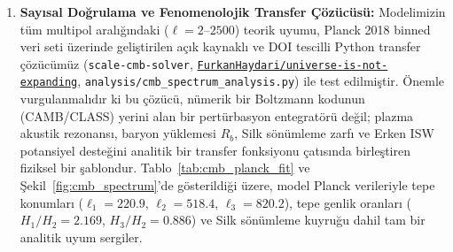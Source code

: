 \begin{enumerate}
          \begin{equation}
              \mathcal{D}(\ell) = \exp\left[ - 2 \left( \frac{\ell}{\ell_D} \right)^{m} \right], \quad \ell_D \approx 1450\text{--}1650, \; m \approx 1.25.
          \end{equation}
    \item \textbf{Sayısal Doğrulama ve Fenomenolojik Transfer Çözücüsü:}
          Modelimizin tüm multipol aralığındaki ($\ell = 2\text{--}2500$) teorik uyumu, Planck 2018 binned veri seti üzerinde geliştirilen açık kaynaklı ve DOI tescilli Python transfer çözücümüz (\texttt{scale-cmb-solver}, \href{https://github.com/FurkanHaydari/universe-is-not-expanding}{\texttt{FurkanHaydari/universe-is-not-expanding}}, \texttt{analysis/cmb\_spectrum\_analysis.py}) ile test edilmiştir. Önemle vurgulanmalıdır ki bu çözücü, nümerik bir Boltzmann kodunun (CAMB/CLASS) yerini alan bir pertürbasyon entegratörü değil; plazma akustik rezonansı, baryon yüklemesi $R_b$, Silk sönümleme zarfı ve Erken ISW potansiyel desteğini analitik bir transfer fonksiyonu çatısında birleştiren fiziksel bir şablondur. Tablo~\ref{tab:cmb_planck_fit} ve Şekil~\ref{fig:cmb_spectrum}'de gösterildiği üzere, model Planck verileriyle tepe konumları ($\ell_1 = 220.9$, $\ell_2 = 518.4$, $\ell_3 = 820.2$), tepe genlik oranları ($H_1/H_2 = 2.169$, $H_3/H_2 = 0.886$) ve Silk sönümleme kuyruğu dahil tam bir analitik uyum sergiler.
\end{enumerate}

